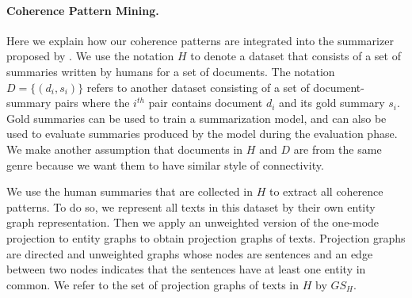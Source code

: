 

\paragraph{Coherence Pattern Mining.} 
%
Here we explain how our coherence patterns are integrated into the summarizer proposed by . 
We use the notation $H$ to denote a dataset that consists of a set of summaries written by humans for a set of documents. 
The notation $D=\lbrace \left( d_i, s_i \right) \rbrace$ refers to another dataset consisting of a set of document-summary pairs where the $i^{th}$ pair contains document $d_i$ and  its gold summary $s_i$.  
Gold summaries can be used to train a summarization model, and can also be used to evaluate summaries produced by the model during the evaluation phase. 
We make another assumption that documents in $H$ and $D$ are from the same genre because we want them to have similar style of connectivity. 

We use the human summaries that are collected in $H$ to extract all coherence patterns. 
To do so, we represent all texts in this dataset by their own entity graph representation. 
Then we apply an unweighted version of the one-mode projection to entity graphs to obtain projection graphs of texts. 
Projection graphs are directed and unweighted graphs whose nodes are sentences and an edge between two nodes indicates that the sentences have at least one entity in common. 
We refer to the set of projection graphs of texts in $H$ by $GS_H$. 

